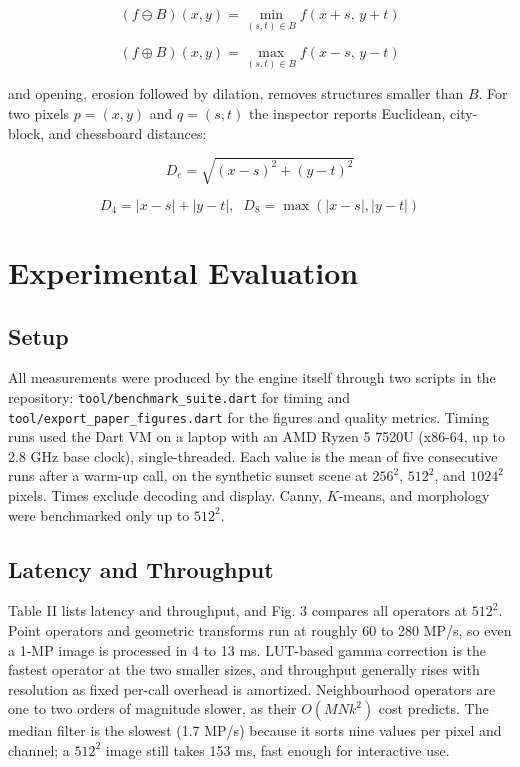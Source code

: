 \documentclass[journal]{IEEEtran}
\begin{document}
\begin{equation}
  (f \ominus B)(x, y) = \min_{(s,t)\in B} f(x+s,\, y+t)
  \label{eq:erode}
\end{equation}

\begin{equation}
  (f \oplus B)(x, y) = \max_{(s,t)\in B} f(x-s,\, y-t)
  \label{eq:dilate}
\end{equation}

and opening, erosion followed by dilation, removes structures smaller than $B$. For two pixels $p=(x, y)$ and $q=(s, t)$ the inspector reports Euclidean, city-block, and chessboard distances:

\begin{equation}
  D_e = \sqrt{(x-s)^{2} + (y-t)^{2}}
  \label{eq:dist_e}
\end{equation}

\begin{equation}
  D_4 = |x-s| + |y-t|, \;\; D_8 = \max(|x-s|, |y-t|)
  \label{eq:dist_48}
\end{equation}

\section{Experimental Evaluation}
\label{sec:eval}
\subsection{Setup}
All measurements were produced by the engine itself through two scripts in the repository: \texttt{tool/benchmark\_suite.dart} for timing and \texttt{tool/export\_paper\_figures.dart} for the figures and quality metrics. Timing runs used the Dart VM on a laptop with an AMD Ryzen 5 7520U (x86-64, up to 2.8 GHz base clock), single-threaded. Each value is the mean of five consecutive runs after a warm-up call, on the synthetic sunset scene at $256^2$, $512^2$, and $1024^2$ pixels. Times exclude decoding and display. Canny, $K$-means, and morphology were benchmarked only up to $512^2$.

\subsection{Latency and Throughput}
Table II lists latency and throughput, and Fig. 3 compares all operators at $512^2$. Point operators and geometric transforms run at roughly 60 to 280 MP/s, so even a 1-MP image is processed in 4 to 13 ms. LUT-based gamma correction is the fastest operator at the two smaller sizes, and throughput generally rises with resolution as fixed per-call overhead is amortized. Neighbourhood operators are one to two orders of magnitude slower, as their $O(MNk^2)$ cost predicts. The median filter is the slowest (1.7 MP/s) because it sorts nine values per pixel and channel; a $512^2$ image still takes 153 ms, fast enough for interactive use.
\end{document}
